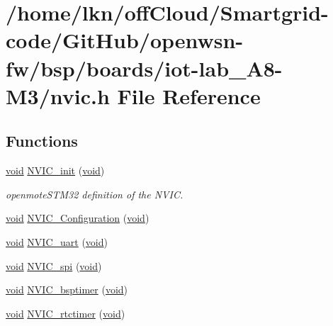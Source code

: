 \hypertarget{iot-lab___a8-_m3_2nvic_8h}{}\section{/home/lkn/off\+Cloud/\+Smartgrid-\/code/\+Git\+Hub/openwsn-\/fw/bsp/boards/iot-\/lab\+\_\+\+A8-\/\+M3/nvic.h File Reference}
\label{iot-lab___a8-_m3_2nvic_8h}
\subsection*{Functions}
\begin{DoxyCompactItemize}
\item 
\hyperlink{usb__devapi_8h_afabf60e7f57651d6d595a02c75f07cd0}{void} \hyperlink{iot-lab___a8-_m3_2nvic_8h_a1981672e898044e1f11c22e019e25823}{N\+V\+I\+C\+\_\+init} (\hyperlink{usb__devapi_8h_afabf60e7f57651d6d595a02c75f07cd0}{void})
\begin{DoxyCompactList}\small\item\em openmote\+S\+T\+M32 definition of the N\+V\+IC. \end{DoxyCompactList}\item 
\hyperlink{usb__devapi_8h_afabf60e7f57651d6d595a02c75f07cd0}{void} \hyperlink{iot-lab___a8-_m3_2nvic_8h_a5c12343e267ace8587309499bea6babe}{N\+V\+I\+C\+\_\+\+Configuration} (\hyperlink{usb__devapi_8h_afabf60e7f57651d6d595a02c75f07cd0}{void})
\item 
\hyperlink{usb__devapi_8h_afabf60e7f57651d6d595a02c75f07cd0}{void} \hyperlink{iot-lab___a8-_m3_2nvic_8h_a36190a9217bee6e01e42721f2d7276d5}{N\+V\+I\+C\+\_\+uart} (\hyperlink{usb__devapi_8h_afabf60e7f57651d6d595a02c75f07cd0}{void})
\item 
\hyperlink{usb__devapi_8h_afabf60e7f57651d6d595a02c75f07cd0}{void} \hyperlink{iot-lab___a8-_m3_2nvic_8h_a7681089016909b7696547e1533d5d298}{N\+V\+I\+C\+\_\+spi} (\hyperlink{usb__devapi_8h_afabf60e7f57651d6d595a02c75f07cd0}{void})
\item 
\hyperlink{usb__devapi_8h_afabf60e7f57651d6d595a02c75f07cd0}{void} \hyperlink{iot-lab___a8-_m3_2nvic_8h_a536b37a571b01eaef542b4cb9da4e14c}{N\+V\+I\+C\+\_\+bsptimer} (\hyperlink{usb__devapi_8h_afabf60e7f57651d6d595a02c75f07cd0}{void})
\item 
\hyperlink{usb__devapi_8h_afabf60e7f57651d6d595a02c75f07cd0}{void} \hyperlink{iot-lab___a8-_m3_2nvic_8h_aff46ffbf74b7562de23473f7429cc6c0}{N\+V\+I\+C\+\_\+rtctimer} (\hyperlink{usb__devapi_8h_afabf60e7f57651d6d595a02c75f07cd0}{void})

\end{DoxyCompactItemize}
